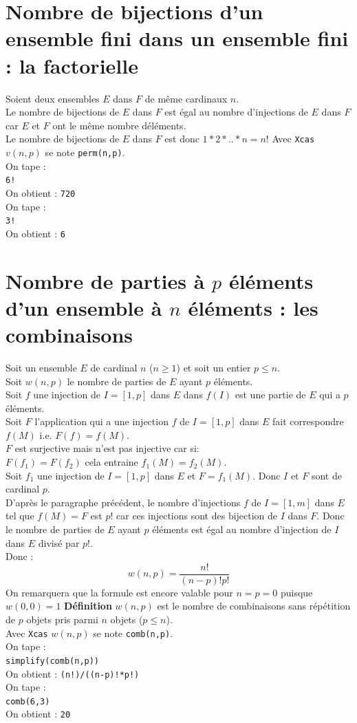 \documentclass[a4paper,11pt]{book}
\begin{document}
\section{Nombre de bijections d'un ensemble fini dans un ensemble fini : la factorielle }
Soient deux ensembles $E$ dans $F$ de m\^eme cardinaux $n$.\\
Le nombre de bijections de $E$ dans $F$ est \'egal au nombre d'injections de $E$
 dans $F$ car $E$ et $F$ ont le m\^eme nombre d\'el\'ements.\\
Le nombre de bijections de $E$ dans $F$ est donc $1*2*..*n =n!$
Avec {\tt Xcas} $v(n,p)$ se note {\tt perm(n,p)}.\\
On tape :\\
{\tt 6!}\\
On obtient :
{\tt 720}\\
On tape :\\
{\tt 3!}\\
On obtient :
{\tt 6}
\section{Nombre de parties \`a $p$ \'el\'ements d'un ensemble \`a $n$ \'el\'ements : les combinaisons}
Soit un ensemble $E$ de cardinal $n$ ($n\geq 1$) et soit un entier $p\leq n$.\\
Soit $w(n,p)$ le nombre de parties de $E$ ayant $p$ \'el\'ements.\\
Soit $f$ une injection de $I=[1,p]$ dans $E$ dans $f(I)$ est une partie de $E$
qui a $p$ \'el\'ements.\\
Soit $F$ l'application qui a  une injection $f$ de $I=[1,p]$ dans $E$ fait 
correspondre $f(M)$ i.e. $F(f)=f(M)$.\\
$F$ est surjective mais n'est pas injective car si:\\
$F(f_1)=F(f_2)$ cela entraine $f_1(M)=f_2(M)$.\\
Soit $f_1$ une injection de $I=[1,p]$ dans $E$ et $F=f_1(M)$. Donc $I$ et $F$ 
sont de cardinal $p$.\\
D'apr\`es le paragraphe pr\'ec\'edent, le nombre d'injections $f$ de 
$I=[1,m]$ dans $E$ tel que $f(M)=F$ est $p!$ car ces injections sont des 
bijection de $I$ dans $F$.
Donc le nombre de parties de $E$ ayant $p$ \'el\'ements est \'egal au nombre d'injection de $I$ dans $E$ divis\'e par $p!$.\\
Donc :
$$w(n,p)=\frac{n!}{(n-p)!p!}$$
On remarquera que la formule est encore valable pour $n=p=0$ puisque $w(0,0)=1$
{\bf D\'efinition} 
$w(n,p)$ est le nombre de combinaisons sans r\'ep\'etition de $p$ objets pris 
parmi $n$ objets ($p\leq n$).\\
Avec {\tt Xcas} $w(n,p)$ se note {\tt comb(n,p)}.\\
On tape :\\
{\tt simplify(comb(n,p))}\\
On obtient :
{\tt (n!)/((n-p)!*p!)}\\
On tape :\\
{\tt comb(6,3)}\\
On obtient :
{\tt 20}
\end{document}
